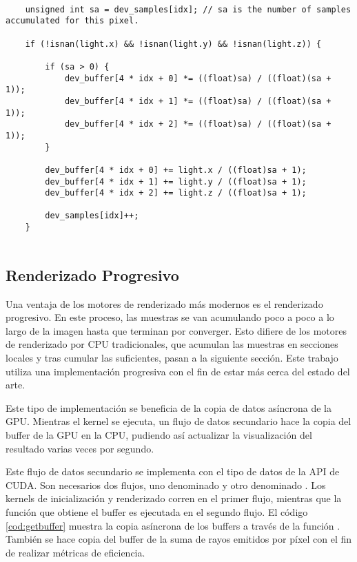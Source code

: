 \begin{minipage}[c]{0.95\textwidth}
\begin{lstlisting}[label={cod:sampleaccumulation}, caption={Código para la acumulación de luz por cada píxel}]
	
	unsigned int sa = dev_samples[idx]; // sa is the number of samples accumulated for this pixel.
	
	if (!isnan(light.x) && !isnan(light.y) && !isnan(light.z)) {

        if (sa > 0) {
            dev_buffer[4 * idx + 0] *= ((float)sa) / ((float)(sa + 1));
            dev_buffer[4 * idx + 1] *= ((float)sa) / ((float)(sa + 1));
            dev_buffer[4 * idx + 2] *= ((float)sa) / ((float)(sa + 1));
        }

        dev_buffer[4 * idx + 0] += light.x / ((float)sa + 1);
        dev_buffer[4 * idx + 1] += light.y / ((float)sa + 1);
        dev_buffer[4 * idx + 2] += light.z / ((float)sa + 1);

        dev_samples[idx]++;
    }
	
\end{lstlisting}
\end{minipage}
	
\subsection{Renderizado Progresivo}
\label{progressiverender}
		
Una ventaja de los motores de renderizado más modernos es el renderizado progresivo. En este proceso, las muestras se van acumulando poco a poco a lo largo de la imagen hasta que terminan por converger. Esto difiere de los motores de renderizado por CPU tradicionales, que acumulan las muestras en secciones locales y tras cumular las suficientes, pasan a la siguiente sección. Este trabajo utiliza una implementación progresiva con el fin de estar más cerca del estado del arte.

Este tipo de implementación se beneficia de la copia de datos asíncrona de la GPU. Mientras el kernel se ejecuta, un flujo de datos secundario hace la copia del buffer de la GPU en la CPU, pudiendo así actualizar la visualización del resultado varias veces por segundo.

Este flujo de datos secundario se implementa con el tipo de datos  de la API de CUDA. Son necesarios dos flujos, uno denominado  y otro denominado . Los kernels de inicialización y renderizado corren en el primer flujo, mientras que la función que obtiene el buffer es ejecutada en el segundo flujo. El código \autoref{cod:getbuffer} muestra la copia asíncrona de los buffers a través de la función . También se hace copia del buffer de la suma de rayos emitidos por píxel  con el fin de realizar métricas de eficiencia.


